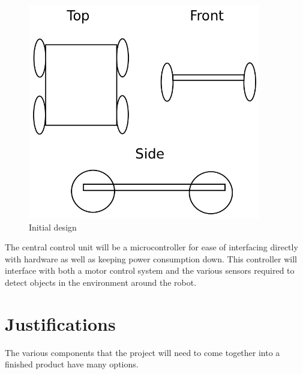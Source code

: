 \begin{figure}[h]
\centering
        \includegraphics[width=4.0in] {Images/initial-design.png}
        \caption{Initial design}
        \label{Initial design}
\end{figure}

The central control unit will be a microcontroller for ease of interfacing directly with hardware as well as keeping power consumption down.  This controller will interface with both a motor control system and the various sensors required to detect objects in the environment around the robot.

\section{Justifications}
The various components that the project will need to come together into a finished product have many options.
